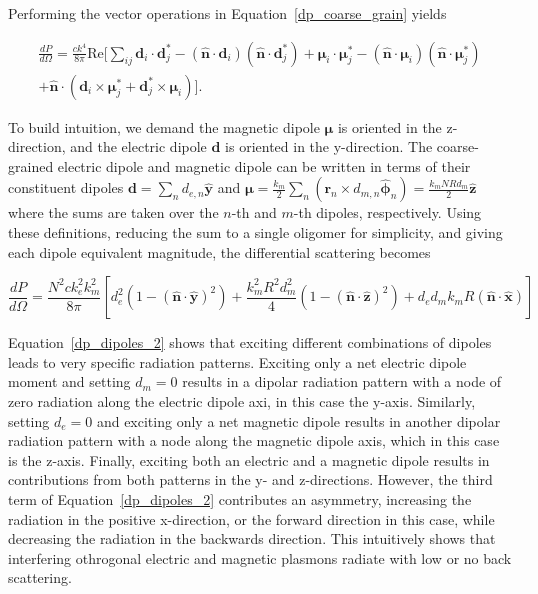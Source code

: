 \documentclass[journal=apchd5,manuscript=article]{achemso}
\begin{document}
Performing the vector operations in Equation~\ref{dp_coarse_grain} yields

\begin{multline}
\frac{dP}{d\Omega} = \frac{ck^4}{8\pi} \textrm{Re} [ \sum_{ij} \textbf{d}_i \cdot \textbf{d}_j^* - (\hat{\textbf{n}} \cdot \textbf{d}_i)(\hat{\textbf{n}} \cdot \textbf{d}_j^*) + \boldsymbol{\mu}_i \cdot \boldsymbol{\mu}_j^* - (\hat{\textbf{n}} \cdot \boldsymbol{\mu}_i)(\hat{\textbf{n}} \cdot \boldsymbol{\mu}_j^*) \\ + \hat{\textbf{n}} \cdot (\textbf{d}_i \times \boldsymbol{\mu}_j^* + \textbf{d}_j^* \times \boldsymbol{\mu}_i) ].
\label{dp_dipoles_1}
\end{multline}

\noindent To build intuition, we demand the magnetic dipole $\boldsymbol{\mu}$ is oriented in the z-direction, and the electric dipole $\textbf{d}$ is oriented in the y-direction. The coarse-grained electric dipole and magnetic dipole can be written in terms of their constituent dipoles $\textbf{d} = \sum_n d_{e,n} \hat{\textbf{y}}$ and $\boldsymbol{\mu} = \frac{k_m}{2}\sum_n(\textbf{r}_n \times d_{m,n} \hat{\boldsymbol{\phi}}_n) = \frac{k_mNRd_m}{2}\hat{\textbf{z}}$ where the sums are taken over the $n$-th and $m$-th dipoles, respectively. Using these definitions, reducing the sum to a single oligomer for simplicity, and giving each dipole equivalent magnitude, the differential scattering becomes

\begin{equation}
\frac{dP}{d\Omega} = \frac{N^2ck_e^2k_m^2}{8\pi}\left[ d_e^2(1 - (\hat{\textbf{n}} \cdot \hat{\textbf{y}})^2) + \frac{k_m^2R^2d_m^2}{4}(1 - (\hat{\textbf{n}} \cdot \hat{\textbf{z}})^2) + d_ed_mk_mR(\hat{\textbf{n}} \cdot \hat{\textbf{x}})\right]
\label{dp_dipoles_2}
\end{equation}

Equation~\ref{dp_dipoles_2} shows that exciting different combinations of dipoles leads to very specific radiation patterns. Exciting only a net electric dipole moment and setting $d_m = 0$ results in a dipolar radiation pattern with a node of zero radiation along the electric dipole axi, in this case the y-axis. Similarly, setting $d_e = 0$ and exciting only a net magnetic dipole results in another dipolar radiation pattern with a node along the magnetic dipole axis, which in this case is the z-axis. Finally, exciting both an electric and a magnetic dipole results in contributions from both patterns in the y- and z-directions. However, the third term of Equation~\ref{dp_dipoles_2} contributes an asymmetry, increasing the radiation in the positive x-direction, or the forward direction in this case, while decreasing the radiation in the backwards direction. This intuitively shows that interfering othrogonal electric and magnetic plasmons radiate with low or no back scattering\cite{Dionne2011}.
\end{document}
